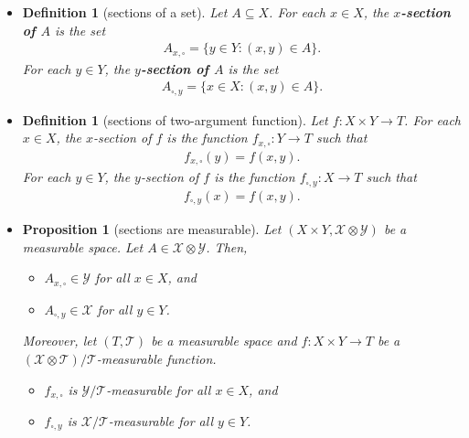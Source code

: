 \documentclass[10pt]{article}
\newtheorem{definition}[lemma]{Definition}
\newtheorem{proposition}[lemma]{Proposition}
\newtheorem{corollary}[lemma]{Corollary}
\numberwithin{lemma}{section}
\newcommand{\mcal}[1]{\mathcal{#1}}
\newcommand{\Real}{\mathbb{R}}
\begin{document}
\begin{itemize}
  \begin{corollary}
    For any $n > d \geq 1$, we have
    \begin{align*}
      (\Real^n, \mcal{B}(\Real^n), v^n) = (\Real^d \times \Real^{n-d}, \mcal{B}(\Real^d) \otimes \mcal{B}(\Real^{n-d}), v^d \times v^{n-d}).
    \end{align*}
  \end{corollary}

  \item \begin{definition}[sections of a set]
    Let $A \subseteq X$. For each $x \in X$, the {\bf $x$-section of $A$} is the set
    \begin{align*}
      A_{x,\square} = \{ y \in Y : (x,y) \in A \}.
    \end{align*}
    For each $y \in Y$, the {\bf $y$-section of $A$} is the set
    \begin{align*}
      A_{\square,y} = \{ x \in X : (x,y) \in A \}.
    \end{align*}
  \end{definition}

  \item \begin{definition}[sections of two-argument function]
    Let $f: X \times Y \rightarrow T$. For each $x \in X$, the $x$-section of $f$ is the function $f_{x,\square} : Y \rightarrow T$ such that
    \begin{align*}
      f_{x,\square}(y) = f(x,y).
    \end{align*}
    For each $y \in Y$, the $y$-section of $f$ is the function $f_{\square,y}: X \rightarrow T$ such that
    \begin{align*}
      f_{\square,y}(x) = f(x,y).
    \end{align*}
  \end{definition}

  \item \begin{proposition}[sections are measurable]
    Let $(X \times Y, \mcal{X} \otimes \mcal{Y})$ be a measurable space. Let $A \in \mcal{X} \otimes \mcal{Y}$. Then,
    \begin{itemize}
      \item $A_{x,\square} \in \mcal{Y}$ for all $x \in X$, and
      \item $A_{\square,y} \in \mcal{X}$ for all $y \in Y$.
    \end{itemize}
    Moreover, let $(T, \mcal{T})$ be a measurable space and $f: X\times Y \rightarrow T$ be a $(\mcal{X}\otimes\mcal{T})/\mcal{T}$-measurable function.
    \begin{itemize}
      \item $f_{x,\square}$ is $\mcal{Y}/\mcal{T}$-measurable for all $x \in X$, and
      \item $f_{\square,y}$ is $\mcal{X}/\mcal{T}$-measurable for all $y \in Y$.
    \end{itemize}
  \end{proposition}


\end{itemize}
\end{document}

